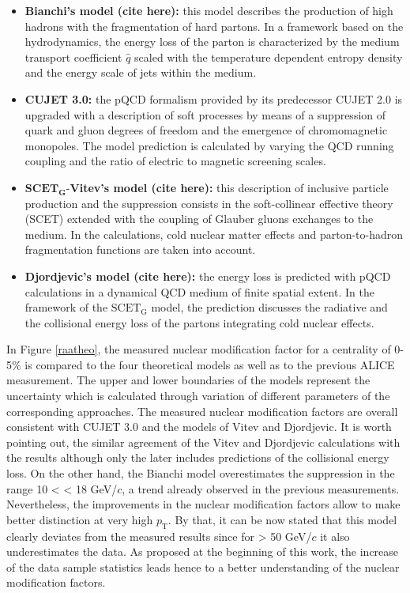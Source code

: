 \documentclass[12pt,a4paper]{report}
\begin{document}
\begin{itemize}
\item \textbf{Bianchi's model (cite here):} this model describes the production of high \pt hadrons with the fragmentation of hard partons. In a framework based on the hydrodynamics, the energy loss of the parton is characterized by the medium transport coefficient $\hat q$ scaled with the temperature dependent entropy density and the energy scale of jets within the medium.
\item \textbf{CUJET 3.0:} the pQCD formalism provided by its predecessor CUJET 2.0 is upgraded with a description of soft processes by means of a suppression of quark and gluon degrees of freedom and the emergence of chromomagnetic monopoles. The model prediction is calculated by varying the QCD running coupling and the ratio of electric to magnetic screening scales. 
\item $\mathbf{SCET}_\mathbf{G}$-\textbf{Vitev's model (cite here):} this description of inclusive particle production and the suppression consists in the soft-collinear effective theory (SCET) extended with the coupling of Glauber gluons exchanges to the medium. In the calculations, cold nuclear matter effects and parton-to-hadron fragmentation functions are taken into account.
\item \textbf{Djordjevic's model (cite here):} the energy loss is predicted with pQCD calculations in a dynamical QCD medium of finite spatial extent. In the framework of the $\text{SCET}_\text{G}$ model, the prediction discusses the radiative and the collisional energy loss of the partons integrating cold nuclear effects.
\end{itemize}
In Figure \ref{raatheo}, the measured nuclear modification factor for a centrality of 0-5\% is compared to the four theoretical models as well as to the previous ALICE measurement. The upper and lower boundaries of the models represent the uncertainty which is calculated through variation of different parameters of the corresponding approaches. The measured nuclear modification factors are overall consistent with CUJET 3.0 and the models of Vitev and Djordjevic. It is worth pointing out, the similar agreement of the Vitev and Djordjevic calculations with the results although only the later includes predictions of the collisional energy loss. On the other hand, the Bianchi model overestimates the suppression in the \pt range 10 < \pt < 18 GeV/$c$, a trend already observed in the previous measurements. Nevertheless, the improvements in the nuclear modification factors allow to make better distinction at very high $p_\text{T}$. By that, it can be now stated that this model clearly deviates from the measured results since for \pt > 50 GeV/$c$ it also underestimates the data. As proposed at the beginning of this work, the increase of the data sample statistics leads hence to a better understanding of the nuclear modification factors.
\end{document}
